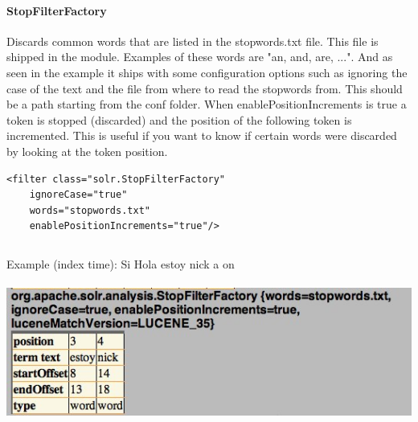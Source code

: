 \paragraph{StopFilterFactory} Discards common words that are listed in the stopwords.txt file. This file is shipped in the module. Examples of these words are "an, and, are, ...". And as seen in the example it ships with some configuration options such as ignoring the case of the text and the file from where to read the stopwords from. This should be a path starting from the conf folder.  When enablePositionIncrements is true a token is stopped (discarded) and the position of the following token is incremented. This is useful if you want to know if certain words were discarded by looking at the token position.
\begin{verbatim}
<filter class="solr.StopFilterFactory"
    ignoreCase="true"
    words="stopwords.txt"
    enablePositionIncrements="true"/>
\end{verbatim}
\inputminted[fontsize=\scriptsize,linenos]{xml}{./code_examples/stopwords.txt}
Example (index time): Si Hola estoy nick a on
\mbox{} \\
\mbox{} \\
\includegraphics[width=\textwidth]{images/stopfilterfactory.jpg}

